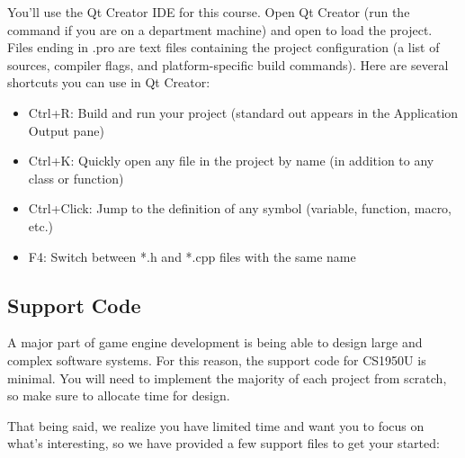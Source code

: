 \documentclass{../cs195u}
\begin{document}
You’ll use the Qt Creator IDE for this course. Open Qt Creator (run the  command if you are on a department machine) and open  to load the project. Files ending in .pro are text files containing the project configuration (a list of sources, compiler flags, and platform-specific build commands). Here are several shortcuts you can use in Qt Creator:


  \begin{itemize}
   \item Ctrl+R: Build and run your project (standard out appears in the Application Output pane)
   \item Ctrl+K: Quickly open any file in the project by name (in addition to any class or function)
   \item Ctrl+Click: Jump to the definition of any symbol (variable, function, macro, etc.)
   \item F4: Switch between *.h and *.cpp files with the same name
  \end{itemize}

  \subsection*{Support Code}
  A major part of game engine development is being able to design large and complex software systems. For this reason, the support code for CS1950U is minimal. You will need to implement the majority of each project from scratch, so make sure to allocate time for design. 

  That being said, we realize you have limited time and want you to focus on what's interesting, so we have provided a few support files to get your started:
\end{document}
